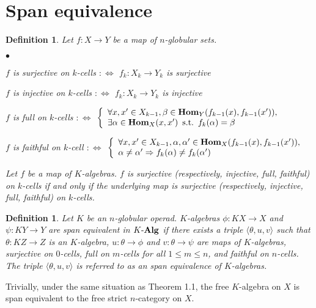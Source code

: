 \documentclass[12pt]{article}
\theoremstyle{plain}
\newtheorem{definition}[theorem]{Definition}
\theoremstyle{definition}
\begin{document}
\section{Span equivalence}

\begin{definition}
Let $f:X \rightarrow Y$ be a map of $n$-globular sets.
\begin{list}{$\bullet$}{}
\item $f$ is \emph{surjective on $k$-cells} $ : \Leftrightarrow$ $f_k : X_k \rightarrow Y_k $ is surjective
\item $f$ is \emph{injective on $k$-cells} $ : \Leftrightarrow$ $f_k : X_k \rightarrow Y_k $ is injective
\item $f$ is \emph{full on $k$-cells} $ : \Leftrightarrow$ 
$\left\{ \begin{array}{l} 
\forall x, x' \in X_{k-1}, \beta \in {\bf Hom}_{Y}(f_{k-1}(x), f_{k-1}(x')), \\
\exists \alpha \in {\bf Hom}_{X}(x,x') \hspace{5pt} {\rm s.t.} \hspace{5pt} f_{k}( \alpha )=\beta \\
\end{array} \right.$
\item $f$ is {\em faithful on $k$-cell} $ : \Leftrightarrow$ 
$\left\{ \begin{array}{l}{}
\forall x,x' \in X_{k-1}, \alpha ,\alpha ' \in {\bf Hom}_{X}(f_{k-1}(x),f_{k-1}(x')), \\
\alpha \neq \alpha ' \Rightarrow f_{k}(\alpha) \neq f_{k}(\alpha ' )
\end{array} \right.$
\end{list}
Let $f$ be a map of $K$-algebras. $f$ is \emph{surjective} (respectively, \emph{injective}, \emph{full}, \emph{faithful}) on $k$-cells if and only if the underlying map is surjective (respectively, injective, full, faithful) on $k$-cells.
\end{definition}

\begin{definition}
Let $K$ be an $n$-globular operad. $K$-algebras $\phi : KX \rightarrow X$ and $\psi : KY \rightarrow Y$ are {\em span equivalent in $K \mathchar`- {\bf Alg}$} if there exists a triple $\langle \theta , u, v \rangle$ such that $\theta : KZ \rightarrow Z$ is an $K$-algebra, $u: \theta \rightarrow \phi $ and $v: \theta \rightarrow \psi $ are maps of $K$-algebras, surjective on $0$-cells, full on $m$-cells for all $1 \leq m \leq n$, and faithful on $n$-cells. The triple $\langle \theta , u, v \rangle$ is referred to as an span equivalence of $K$-algebras.
\end{definition}
\noindent
Trivially, under the same situation as Theorem 1.1, the free $K$-algebra on $X$ is span equivalent to the free strict $n$-category on $X$. 
\end{document}
